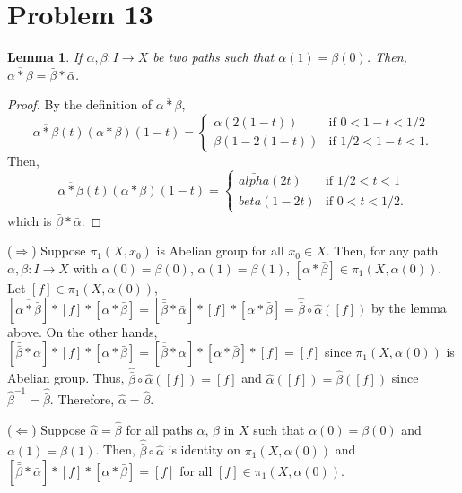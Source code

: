 \documentclass{article}
\newtheorem{lemma}{Lemma}
\begin{document}
\section*{Problem 13}
\begin{lemma}
If $\alpha,\beta:I\rightarrow X$ be two paths such that $\alpha(1)=\beta(0)$. Then, $\overline{\alpha*\beta}=\bar{\beta}*\bar{\alpha}$.
\end{lemma}
\begin{proof}
By the definition of $\overline{\alpha*\beta}$,
\begin{equation*}
\overline{\alpha*\beta}(t)(\alpha*\beta)(1-t)=\begin{cases}
\alpha(2(1-t)) & \text{if }0<1-t<1/2 \\
\beta(1-2(1-t)) & \text{if }1/2<1-t<1.
\end{cases}
\end{equation*}
Then,
\begin{equation*}
\overline{\alpha*\beta}(t)(\alpha*\beta)(1-t)=\begin{cases}
\bar{alpha}(2t) & \text{if }1/2<t<1 \\
\bar{beta}(1-2t) & \text{if }0<t<1/2.
\end{cases}
\end{equation*}
which is $\bar{\beta}*\bar{\alpha}$.
\end{proof}
($\Rightarrow$) Suppose $\pi_1(X, x_0)$ is Abelian group for all $x_0\in X$. Then, for any path $\alpha,\beta:I\rightarrow X$ with $\alpha(0)=\beta(0)$, $\alpha(1)=\beta(1)$, $[\alpha*\bar{\beta}]\in \pi_1(X, \alpha(0))$. Let $[f]\in \pi_1(X, \alpha(0))$, $[\overline{\alpha*\bar{\beta}}]*[f]*[\alpha*\bar{\beta}]=[\bar{\bar{\beta}}*\bar{\alpha}]*[f]*[\alpha*\bar{\beta}]=\hat{\bar{\beta}}\circ \hat{\alpha}([f])$ by the lemma above. On the other hands, $[\bar{\bar{\beta}}*\bar{\alpha}]*[f]*[\alpha*\bar{\beta}]=[\overline{\bar{\beta}}*\bar{\alpha}]*[\alpha*\bar{\beta}]*[f]=[f]$ since $\pi_1(X, \alpha(0))$ is Abelian group. Thus, $\hat{\bar{\beta}}\circ \hat{\alpha}([f])=[f]$ and $\hat{\alpha}([f])=\hat{\beta}([f])$ since $\hat{\beta}^{-1}=\hat{\bar{\beta}}$. Therefore, $\hat{\alpha}=\hat{\beta}$.

($\Leftarrow$) Suppose $\hat{\alpha}=\hat{\beta}$ for all paths $\alpha$, $\beta$ in $X$ such that $\alpha(0)=\beta(0)$ and $\alpha(1)=\beta(1)$. Then, $\hat{\bar{\beta}}\circ \hat{\alpha}$ is identity on $\pi_1(X, \alpha(0))$ and $[\bar{\bar{\beta}}*\bar{\alpha}]*[f]*[\alpha*\bar{\beta}]=[f]$ for all $[f]\in \pi_1(X, \alpha(0))$.
\end{document}
